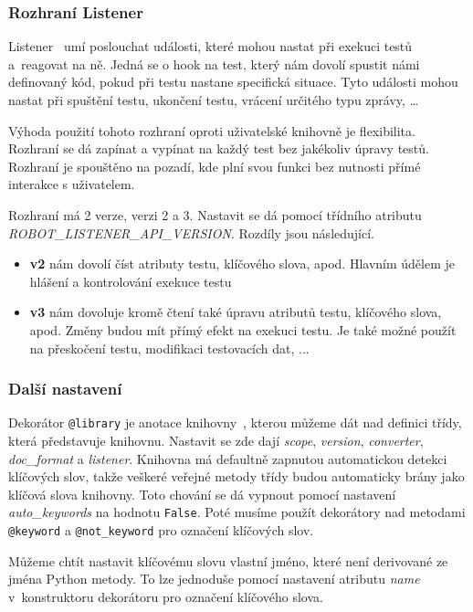 \subsubsection{Rozhraní Listener}

Listener~\cite{robotframeworkListener} umí poslouchat události, které mohou nastat při exekuci testů a~reagovat na ně. Jedná se o hook na test, který nám dovolí spustit námi definovaný kód, pokud při testu nastane specifická situace. Tyto události mohou nastat při spuštění testu, ukončení testu, vrácení určitého typu zprávy, \dots

Výhoda použití tohoto rozhraní oproti uživatelské knihovně je flexibilita. Rozhraní se dá zapínat a vypínat na každý test bez jakékoliv úpravy testů. Rozhraní je spouštěno na pozadí, kde plní svou funkci bez nutnosti přímé interakce s uživatelem.

Rozhraní má 2 verze, verzi 2 a 3. Nastavit se dá pomocí třídního atributu \textit{ROBOT\_LISTENER\_API\_VERSION}. Rozdíly jsou následující.

\begin{itemize}
    \item \textbf{v2} nám dovolí číst atributy testu, klíčového slova, apod. Hlavním údělem je hlášení a kontrolování exekuce testu
    \item \textbf{v3} nám dovoluje kromě čtení také úpravu atributů testu, klíčového slova, apod. Změny budou mít přímý efekt na exekuci testu. Je také možné použít na přeskočení testu, modifikaci testovacích dat, ... 
\end{itemize}

\subsubsection{Další nastavení}

Dekorátor \texttt{@library} je anotace knihovny~\cite{robotframeworkUserGuide}, kterou můžeme dát nad definici třídy, která představuje knihovnu. Nastavit se zde dají \textit{scope}, \textit{version}, \textit{converter}, \textit{doc\_format} a \textit{listener}. Knihovna má defaultně zapnutou automatickou detekci klíčových slov, takže veškeré veřejné metody třídy budou automaticky brány jako klíčová slova knihovny. Toto chování se dá vypnout pomocí nastavení \textit{auto\_keywords} na hodnotu \texttt{False}. Poté musíme použít dekorátory nad metodami \texttt{@keyword} a \texttt{@not\_keyword} pro označení klíčových slov.

Můžeme chtít nastavit klíčovému slovu vlastní jméno, které není derivované ze jména Python metody. To lze jednoduše pomocí nastavení atributu \textit{name} v~konstruktoru dekorátoru pro označení klíčového slova.

